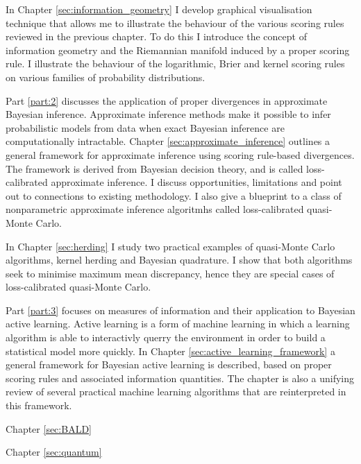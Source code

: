 In Chapter \ref{sec:information_geometry} I develop graphical visualisation technique that allows me to illustrate the behaviour of the various scoring rules reviewed in the previous chapter. To do this I introduce the concept of information geometry and the Riemannian manifold induced by a proper scoring rule. I illustrate the behaviour of the logarithmic, Brier and kernel scoring rules on various families of probability distributions.

Part \ref{part:2} discusses the application of proper divergences in approximate Bayesian inference. Approximate inference methods make it possible to infer probabilistic models from data when exact Bayesian inference are computationally intractable. Chapter \ref{sec:approximate_inference} outlines a general framework for approximate inference using scoring rule-based divergences. The framework is derived from Bayesian decision theory, and is called loss-calibrated approximate inference. I discuss opportunities, limitations and point out to connections to existing methodology. I also give a blueprint to a class of nonparametric approximate inference algoritmhs called loss-calibrated quasi-Monte Carlo.

In Chapter \ref{sec:herding} I study two practical examples of quasi-Monte Carlo algorithms, kernel herding and Bayesian quadrature. I show that both algorithms seek to minimise maximum mean discrepancy, hence they are special cases of loss-calibrated quasi-Monte Carlo. 

Part \ref{part:3} focuses on measures of information and their application to Bayesian active learning. Active learning is a form of machine learning in which a learning algorithm is able to interactivly querry the environment in order to build a statistical model more quickly. In Chapter \ref{sec:active_learning_framework} a general framework for Bayesian active learning is described, based on proper scoring rules and associated information quantities. The chapter is also a unifying review of several practical machine learning algorithms that are reinterpreted in this framework.

Chapter \ref{sec:BALD} 

Chapter \ref{sec:quantum}